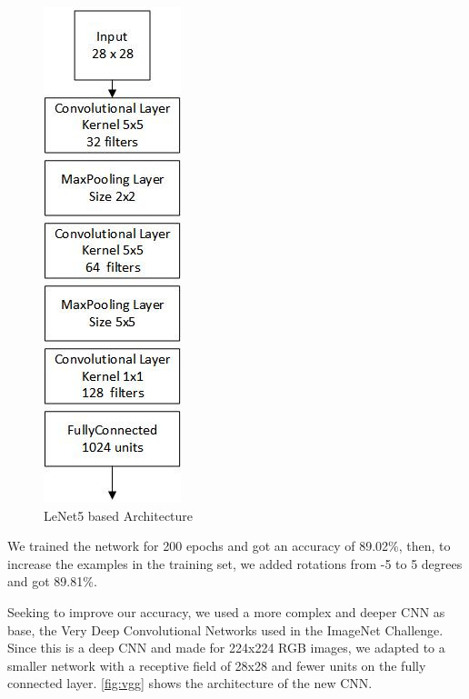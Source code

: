 \documentclass[twoside,twocolumn]{article}
\begin{document}
    \begin{figure}[h]
    \begin{center}
        \includegraphics[scale=0.8]{lenet5Arch.jpg}
        \caption{LeNet5 based Architecture\label{fig:lenet5}}
    \end{center}
    \end{figure}
    
    
    We trained the network for 200 epochs and got an accuracy of 89.02\%, then, to increase the examples in the training set, we added rotations from -5 to 5 degrees and got 89.81\%.
    
    Seeking to improve our accuracy, we used a more complex and deeper CNN as base, the Very Deep Convolutional Networks \cite{DBLP:journals/corr/SimonyanZ14a} used in the  ImageNet Challenge. Since this is a deep CNN and made for 224x224 RGB images, we adapted to a smaller network with a receptive field of 28x28 and fewer units on the fully connected layer. \ref{fig:vgg} shows the architecture of the new CNN.
    
\end{document}
